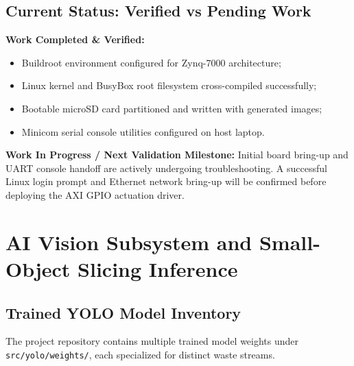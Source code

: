 \documentclass[12pt,a4paper]{article}
\begin{document}
\subsection{Current Status: Verified vs Pending Work}

\begin{reqbox}
\textbf{Work Completed \& Verified:}
\begin{itemize}[noitemsep]
  \item Buildroot environment configured for Zynq-7000 architecture;
  \item Linux kernel and BusyBox root filesystem cross-compiled successfully;
  \item Bootable microSD card partitioned and written with generated images;
  \item Minicom serial console utilities configured on host laptop.
\end{itemize}
\textbf{Work In Progress / Next Validation Milestone:}
Initial board bring-up and UART console handoff are actively undergoing troubleshooting.
A successful Linux login prompt and Ethernet network bring-up will be confirmed before
deploying the AXI GPIO actuation driver.
\end{reqbox}

\clearpage

\section{AI Vision Subsystem and Small-Object Slicing Inference}

\subsection{Trained YOLO Model Inventory}

The project repository contains multiple trained model weights under \texttt{src/yolo/weights/},
each specialized for distinct waste streams.
\end{document}
